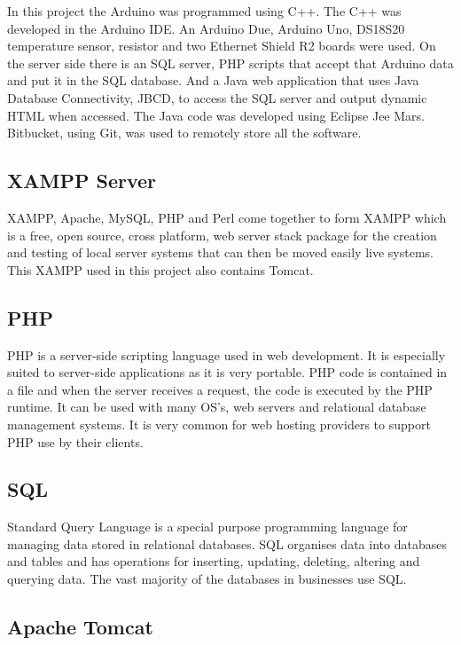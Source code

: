 In this project the Arduino was programmed using C++. The C++ was developed in the Arduino IDE. An Arduino Due, Arduino Uno, DS18S20 temperature sensor, resistor and two Ethernet Shield R2 boards were used. On the server side there is an SQL server, PHP scripts that accept that Arduino data and put it in the SQL database. And a Java web application that uses Java Database Connectivity, JBCD, to access the SQL server and output dynamic HTML when accessed. The Java code was developed using Eclipse Jee Mars. Bitbucket, using Git, was used to remotely store all the software.

\subsection{XAMPP Server}

XAMPP, Apache, MySQL, PHP and Perl come together to form XAMPP which is a free, open source, cross platform, web server stack package for the creation and testing of local server systems that can then be moved easily live systems. This XAMPP used in this project also contains Tomcat.

\subsection{PHP}
PHP is a server-side scripting language used in web development. It is especially suited to server-side applications as it is very portable. PHP code is contained in a file and when the server receives a request, the code is executed by the PHP runtime. It can be used with many OS's, web servers and relational database management systems. It is very common for web hosting providers to support PHP use by their clients.

\subsection{SQL}

Standard Query Language is a special purpose programming language for managing data stored in relational databases. SQL organises data into databases and tables and has operations for inserting, updating, deleting, altering and querying data. The vast majority of the databases in businesses use SQL.

\subsection{Apache Tomcat}

